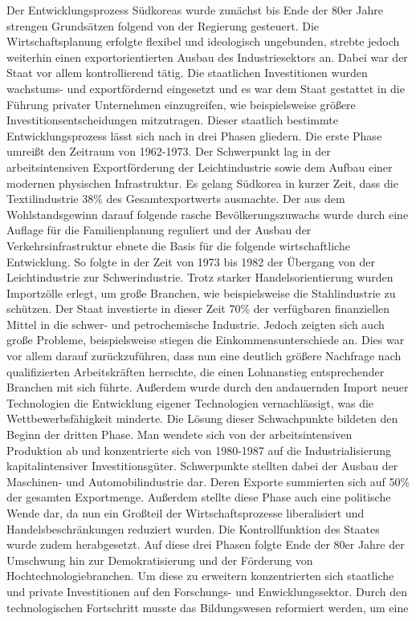 Der Entwicklungsprozess S{\"u}dkoreas wurde zun{\"a}chst bis Ende der 80er Jahre strengen Grunds{\"a}tzen folgend von der Regierung gesteuert. Die Wirtschaftsplanung erfolgte flexibel und ideologisch ungebunden, strebte jedoch weiterhin einen exportorientierten Ausbau des Industriesektors an. Dabei war der Staat vor allem kontrollierend t{\"a}tig. Die staatlichen Investitionen wurden wachstums- und exportf{\"o}rdernd eingesetzt und es war dem Staat gestattet in die F{\"u}hrung privater Unternehmen einzugreifen, wie beispielsweise gr{\"o}{\ss}ere Investitionsentscheidungen mitzutragen. Dieser staatlich bestimmte Entwicklungsprozess l{\"a}sst sich nach  \citet{Engelhard.2004} in drei  Phasen gliedern. \newline Die erste Phase umrei{\ss}t den Zeitraum von 1962-1973. Der Schwerpunkt lag in der arbeitsintensiven Exportf{\"o}rderung der Leichtindustrie sowie dem Aufbau einer modernen physischen Infrastruktur. Es gelang S{\"u}dkorea in kurzer Zeit, dass die Textilindustrie 38{\%} des Gesamtexportwerts ausmachte. Der aus dem Wohlstandsgewinn darauf folgende rasche Bev{\"o}lkerungszuwachs wurde durch eine Auflage f{\"u}r die Familienplanung reguliert und der Ausbau der Verkehrsinfrastruktur ebnete die Basis f{\"u}r die folgende wirtschaftliche Entwicklung. \newline So folgte in der Zeit von 1973 bis 1982 der Übergang von der Leichtindustrie zur Schwerindustrie. Trotz starker Handelsorientierung wurden Importz{\"o}lle erlegt, um gro{\ss}e Branchen, wie beispielsweise die Stahlindustrie zu sch{\"u}tzen. Der Staat investierte in dieser Zeit 70{\%} der verf{\"u}gbaren finanziellen Mittel in die schwer- und petrochemische Industrie. Jedoch zeigten sich auch gro{\ss}e Probleme, beispielsweise stiegen die Einkommensunterschiede an. Dies war vor allem darauf zur{\"u}ckzuf{\"u}hren, dass nun eine deutlich gr{\"o}{\ss}ere Nachfrage nach qualifizierten Arbeitskr{\"a}ften herrschte, die einen Lohnanstieg entsprechender Branchen mit sich f{\"u}hrte. Au{\ss}erdem wurde durch den andauernden Import neuer Technologien die Entwicklung eigener Technologien vernachl{\"a}ssigt, was die Wettbewerbsf{\"a}higkeit minderte. \newline Die L{\"o}sung dieser Schwachpunkte bildeten den Beginn der dritten Phase. Man wendete sich von der arbeitsintensiven Produktion ab und konzentrierte sich von 1980-1987 auf die Industrialisierung kapitalintensiver Investitionsg{\"u}ter. Schwerpunkte stellten dabei der Ausbau der Maschinen- und  Automobilindustrie dar. Deren Exporte summierten sich auf 50{\%} der gesamten Exportmenge. Au{\ss}erdem stellte diese Phase auch eine politische Wende dar, da nun ein Gro{\ss}teil der Wirtschaftsprozesse liberalisiert und Handelsbeschr{\"a}nkungen reduziert wurden. Die Kontrollfunktion des Staates wurde zudem herabgesetzt. \newline Auf diese drei Phasen folgte Ende der 80er Jahre der Umschwung hin zur Demokratisierung und der F{\"o}rderung von Hochtechnologiebranchen. Um diese zu erweitern konzentrierten sich staatliche und private Investitionen auf den Forschungs- und Enwicklungssektor. Durch den technologischen Fortschritt musste das Bildungswesen reformiert werden, um eine 